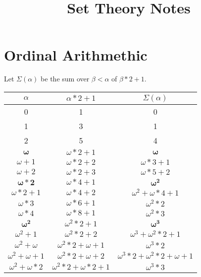 \documentclass[oneside,12pt]{amsart}
\begin{document}
\title{Set Theory Notes}

\maketitle

\tableofcontents

\section{Ordinal Arithmethic}

Let $\Sigma(\alpha)$ be the sum over $\beta<\alpha$
of $\beta*2+1$.

\begin{tabular}{|c|c|c|}
\hline $\alpha$ & $\alpha*2+1$ & $\Sigma(\alpha)$ \\ \hline \hline
0 & 1 & 0 \\ \hline
1 & 3 & 1 \\ \hline
2 & 5 & 4 \\ \hline \hline

$\boldsymbol{\omega}$ & $\omega*2+1$ & $\boldsymbol{\omega}$ \\ \hline
$\omega + 1$ & $\omega*2+2$ & $\omega*3 + 1$ \\ \hline
$\omega + 2$ & $\omega*2+3$ & $\omega*5 + 2$ \\ \hline \hline

$\boldsymbol{\omega*2}$ & $\omega*4+1$ & $\boldsymbol{\omega^2}$ \\ \hline
$\omega*2 + 1$ & $\omega*4+2$ & $\omega^2 + \omega*4+1$ \\ \hline \hline

$\omega*3$ & $\omega*6+1$ & $\omega^2 *2$ \\ \hline \hline

$\omega*4$ & $\omega*8+1$ & $\omega^2 *3$ \\ \hline \hline

$\boldsymbol{\omega^2}$ & $\omega^2*2+1$ & $\boldsymbol{\omega^3}$ \\ \hline
$\omega^2 + 1$ & $\omega^2*2+2$ & $\omega^3 + \omega^2*2+1$ \\ \hline \hline

$\omega^2 + \omega$ & $\omega^2*2+\omega + 1$ & $\omega^3 * 2$ \\ \hline
$\omega^2 + \omega + 1$ & $\omega^2*2+ \omega + 2$ & $\omega^3*2 + \omega^2*2+\omega + 1$ \\ \hline \hline

$\omega^2 + \omega*2$ & $\omega^2*2+\omega*2 + 1$ & $\omega^3 * 3$ \\ \hline


\end{tabular}
\end{document}
